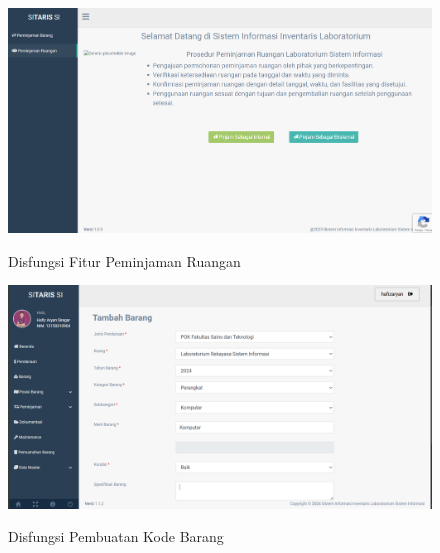 \begin{figure}
	\centering
	\includegraphics[width=0.82\linewidth]{konten//gambar/observasi-peminjaman-ruangan.png}
	\caption{Disfungsi Fitur Peminjaman Ruangan} \protect\cite{sitaris}
	\label{fig:enter-label}
\end{figure}

\begin{figure}
	\centering
	\includegraphics[width=0.82\linewidth]{konten//gambar/kode-barang.png}
	\caption{Disfungsi Pembuatan Kode Barang} \protect\cite{sitaris}
	\label{fig:enter-label}
\end{figure}